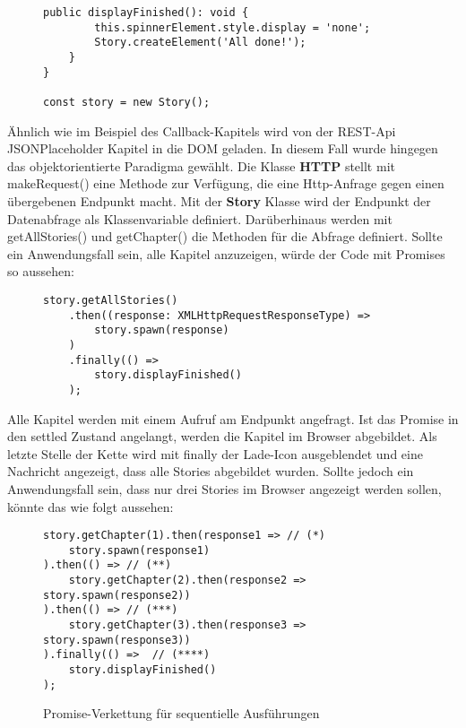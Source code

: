 \begin{figure}[H]
\begin{lstlisting}[basicstyle=\small]
public displayFinished(): void {
        this.spinnerElement.style.display = 'none';
        Story.createElement('All done!');
    }
}

const story = new Story();
\end{lstlisting}
\end{figure}

\noindent
Ähnlich wie im Beispiel des Callback-Kapitels wird von der REST-Api JSONPlaceholder Kapitel in die DOM geladen. In diesem Fall wurde hingegen das objektorientierte Paradigma gewählt. Die Klasse \textbf{HTTP} stellt mit makeRequest() eine Methode zur Verfügung, die eine Http-Anfrage gegen einen übergebenen Endpunkt macht. Mit der \textbf{Story} Klasse wird der Endpunkt der Datenabfrage als Klassenvariable definiert. Darüberhinaus werden mit getAllStories() und getChapter() die Methoden für die Abfrage definiert. Sollte ein Anwendungsfall sein, alle Kapitel anzuzeigen, würde der Code mit Promises so aussehen:

\begin{figure}[H]
\begin{lstlisting}[basicstyle=\small]
story.getAllStories()
    .then((response: XMLHttpRequestResponseType) =>
        story.spawn(response)
    )
    .finally(() =>
        story.displayFinished()
    );
\end{lstlisting}
\end{figure}

\noindent
Alle Kapitel werden mit einem Aufruf am Endpunkt angefragt. Ist das Promise in den settled Zustand angelangt, werden die Kapitel im Browser abgebildet. Als letzte Stelle der Kette wird mit finally der Lade-Icon ausgeblendet und eine Nachricht angezeigt, dass alle Stories abgebildet wurden. Sollte jedoch ein Anwendungsfall sein, dass nur drei Stories im Browser angezeigt werden sollen, könnte das wie folgt aussehen: 

\begin{figure}[H]
\begin{lstlisting}[basicstyle=\small]
story.getChapter(1).then(response1 => // (*)
    story.spawn(response1)
).then(() => // (**)
    story.getChapter(2).then(response2 => story.spawn(response2))
).then(() => // (***)
    story.getChapter(3).then(response3 => story.spawn(response3))
).finally(() =>  // (****)
    story.displayFinished()
);
\end{lstlisting}
\caption{Promise-Verkettung für sequentielle Ausführungen}
\label{Promises-sequential-calls}
\end{figure}

